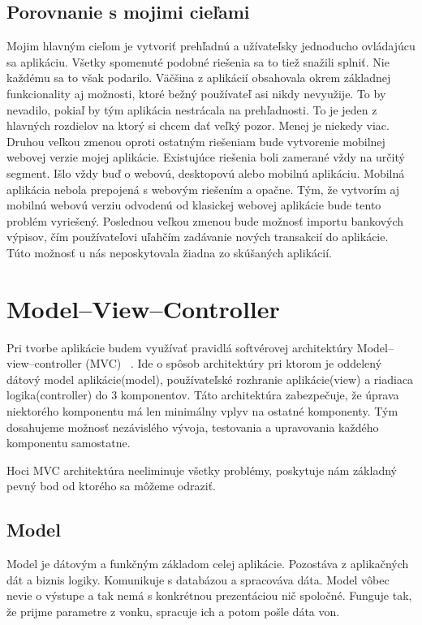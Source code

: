 \documentclass[12pt]{book}
\begin{document}
\subsection{Porovnanie s mojimi cieľami}
Mojim hlavným cieľom je vytvoriť prehľadnú a užívateľsky jednoducho ovládajúcu sa aplikáciu. Všetky spomenuté podobné riešenia sa to tiež snažili splniť. Nie každému sa to však podarilo. Väčšina z aplikácií obsahovala okrem základnej funkcionality aj možnosti, ktoré bežný používateľ asi nikdy nevyužije. To by nevadilo, pokiaľ by tým aplikácia nestrácala na prehľadnosti. To je jeden z hlavných rozdielov na ktorý si chcem dať veľký pozor. Menej je niekedy viac. Druhou veľkou zmenou oproti ostatným riešeniam bude vytvorenie mobilnej webovej verzie mojej aplikácie. Existujúce riešenia boli zamerané vždy na určitý segment. Išlo vždy buď o webovú, desktopovú alebo mobilnú aplikáciu. Mobilná aplikácia nebola prepojená s webovým riešením a opačne. Tým, že vytvorím aj mobilnú webovú verziu odvodenú od klasickej webovej aplikácie bude tento problém vyriešený. Poslednou veľkou zmenou bude možnosť importu bankových výpisov, čím používateľovi uľahčím zadávanie nových transakcií do aplikácie. Túto možnosť u nás neposkytovala žiadna zo skúšaných aplikácií.

\section{Model–View–Controller}
Pri tvorbe aplikácie budem využívať pravidlá softvérovej architektúry Model–view–controller (MVC) \cite{MVCdevbook}\ . Ide o spôsob architektúry pri ktorom je oddelený dátový model aplikácie(model), používateľské rozhranie aplikácie(view) a riadiaca logika(controller) do 3 komponentov. Táto architektúra zabezpečuje, že úprava niektorého komponentu má len minimálny vplyv na ostatné komponenty. Tým dosahujeme možnosť nezávislého vývoja, testovania a upravovania každého komponentu samostatne.

Hoci MVC architektúra neeliminuje všetky problémy, poskytuje nám základný pevný bod od ktorého sa môžeme odraziť.

\subsection{Model}
Model je dátovým a funkčným základom celej aplikácie. Pozostáva z aplikačných dát a biznis logiky. Komunikuje s databázou a spracováva dáta. Model vôbec nevie o výstupe a tak nemá s konkrétnou prezentáciou nič spoločné. Funguje tak, že prijme parametre z vonku, spracuje ich a potom pošle dáta von. 
\end{document}
